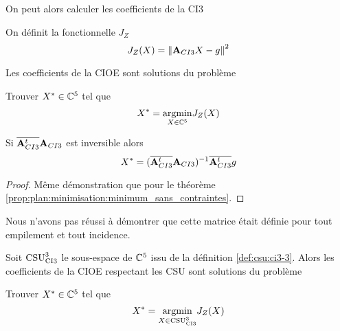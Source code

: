     On peut alors calculer les coefficients de la CI3
    \begin{defn}
      On définit la fonctionnelle \(J_Z\)
      \begin{equation*}
        J_Z(X) = \norm{{\mA}_{CI3}X - {g}}^2
      \end{equation*}
    \end{defn}
    \begin{thm}

      Les coefficients de la CIOE sont solutions du problème

      Trouver \(X^* \in \CC^5\) tel que
      \begin{equation*}
        X^* = \argmin{X\in \CC^5}  J_Z(X)
      \end{equation*}
    \end{thm}

    \begin{prop}
      \label{prop:sphere:minimisation:minimum_sans_contraintes}
      Si \(\conj{\mA_{CI3}^t}\mA_{CI3}\) est inversible alors
      \begin{equation*}
        X^* = (\conj{\mA_{CI3}^t}\mA_{CI3})^{-1}\conj{\mA_{CI3}^t}g
      \end{equation*}
    \end{prop}

    \begin{proof}
      Même démonstration que pour le théorème \ref{prop:plan:minimisation:minimum_sans_contraintes}.
    \end{proof}

    Nous n'avons pas réussi à démontrer que cette matrice était définie pour tout empilement et tout incidence.

    \begin{thm}

      Soit \(\CSU[3]{CI3}\) le sous-espace de \(\CC^5\) issu de la définition \ref{def:csu:ci3-3}.
      Alors les coefficients de la CIOE respectant les CSU sont solutions du problème

      Trouver \(X^* \in \CC^5\) tel que
      \begin{equation*}
        X^* = \argmin{X\in \CSU[3]{CI3}}  J_Z(X)
      \end{equation*}
    \end{thm}
